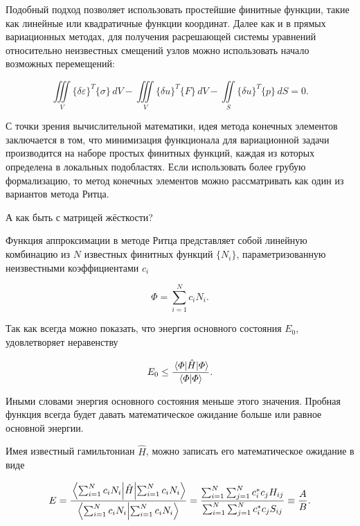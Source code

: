 \documentclass{article}
\begin{document}
Подобный подход позволяет использовать простейшие финитные функции, такие как линейные или квадратичные функции координат. Далее как и в прямых вариационных методах, для получения расрешающей системы уравнений относительно неизвестных смещений узлов можно использовать начало возможных перемещений:

\begin{displaymath}
	\iiint\limits_V \{ \delta \varepsilon \}^{T} \{\sigma\} \,dV - \iiint\limits_V \{ \delta u \}^{T} \{ F \} \,dV - \iint\limits_S \{ \delta u \}^{T} \{ p \} \,dS = 0.
\end{displaymath}

С точки зрения вычислительной математики, идея метода конечных элементов заключается в том, что минимизация функционала для вариационной задачи производится на наборе простых финитных функций, каждая из которых определена в локальных подобластях. Если использовать более грубую формализацию, то метод конечных элементов можно рассматривать как один из вариантов метода Ритца.

\newpage
\begin{question}
	А как быть с матрицей жёсткости?
\end{question}

Функция аппроксимации в методе Ритца представляет собой линейную комбинацию из $N$ известных финитных функций $\{ N_{i} \}$, параметризованную неизвестными коэффициентами $c_{i}$

\begin{displaymath}
	\varPhi = \sum_{i=1}^{N} c_{i} N_{i}.
\end{displaymath}

Так как всегда можно показать, что энергия основного состояния $E_{0}$, удовлетворяет неравенству

\begin{displaymath}
	E_{0} \leq \frac{\expval{\hat{H}}{\varPhi}}{\bra{\varPhi} \ket{\varPhi}}.
\end{displaymath}

Иными словами энергия основного состояния меньше этого значения. Пробная функция всегда будет давать математическое ожидание больше или равное основной энергии.

Имея известный гамильтониан $\hat{H}$, можно записать его математическое ожидание в виде

\begin{displaymath}
	E = \frac{\expval{\hat{H}}{\sum_{i=1}^{N} c_{i} N_{i}}}{\bra{\sum_{i=1}^{N} c_{i} N_{i}} \ket{\sum_{i=1}^{N} c_{i} N_{i}} } = \frac{\sum_{i=1}^{N} \sum_{j=1}^{N} c_{i}^{*} c_{j} H_{ij}}{\sum_{i=1}^{N} \sum_{j=1}^{N} c_{i}^{*} c_{j} S_{ij}} \equiv \frac{A}{B}.
\end{displaymath}
\end{document}
